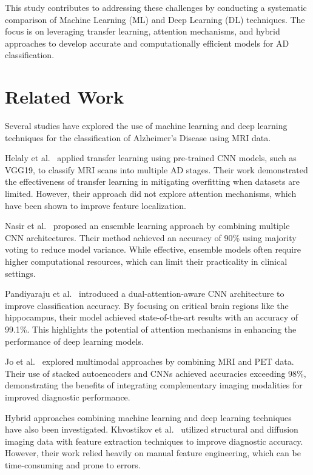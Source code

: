 \documentclass[runningheads]{llncs}
\begin{document}
This study contributes to addressing these challenges by conducting a systematic comparison of Machine Learning (ML) and Deep Learning (DL) techniques. The focus is on leveraging transfer learning, attention mechanisms, and hybrid approaches to develop accurate and computationally efficient models for AD classification.

\section{Related Work}

Several studies have explored the use of machine learning and deep learning techniques for the classification of Alzheimer's Disease using MRI data.

Helaly et al.~\cite{helaly2021} applied transfer learning using pre-trained CNN models, such as VGG19, to classify MRI scans into multiple AD stages. Their work demonstrated the effectiveness of transfer learning in mitigating overfitting when datasets are limited. However, their approach did not explore attention mechanisms, which have been shown to improve feature localization.

Nasir et al.~\cite{nasir2021} proposed an ensemble learning approach by combining multiple CNN architectures. Their method achieved an accuracy of 90\% using majority voting to reduce model variance. While effective, ensemble models often require higher computational resources, which can limit their practicality in clinical settings.

Pandiyaraju et al.~\cite{pandiyaraju2022} introduced a dual-attention-aware CNN architecture to improve classification accuracy. By focusing on critical brain regions like the hippocampus, their model achieved state-of-the-art results with an accuracy of 99.1\%. This highlights the potential of attention mechanisms in enhancing the performance of deep learning models.

Jo et al.~\cite{jo2021} explored multimodal approaches by combining MRI and PET data. Their use of stacked autoencoders and CNNs achieved accuracies exceeding 98\%, demonstrating the benefits of integrating complementary imaging modalities for improved diagnostic performance.

Hybrid approaches combining machine learning and deep learning techniques have also been investigated. Khvostikov et al.~\cite{khvostikov2022} utilized structural and diffusion imaging data with feature extraction techniques to improve diagnostic accuracy. However, their work relied heavily on manual feature engineering, which can be time-consuming and prone to errors.
\end{document}
